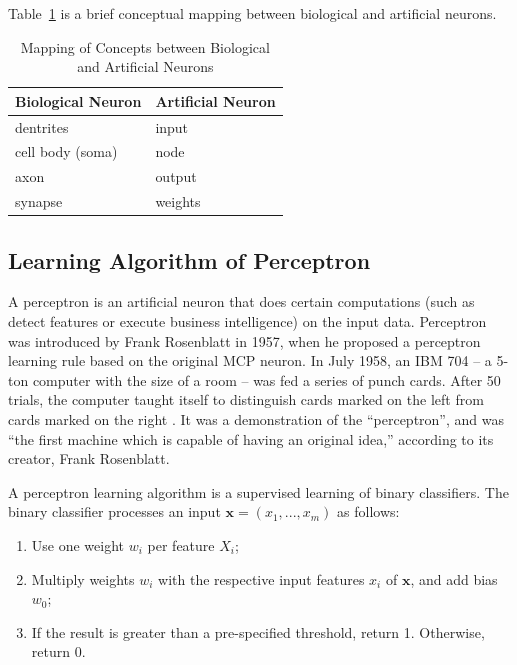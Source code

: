 Table~\ref{tab:bioartneurons} is a brief conceptual mapping between biological and artificial neurons. 

\begin{table}[!htbp]
    \centering
    \begin{tabular}{|l|l|}
    \hline
       Biological Neuron  &  Artificial Neuron \\
       \hline
        dentrites & input \\
        cell body (soma) & node \\
        axon & output \\
        synapse & weights \\ 
        \hline
    \end{tabular}
    \caption{Mapping of Concepts between Biological and Artificial Neurons}
    \label{tab:bioartneurons}
\end{table}

\subsection*{Learning Algorithm of Perceptron}

A perceptron is an artificial neuron that does certain computations (such as detect features or execute business intelligence) on the input data. 
Perceptron was introduced by Frank Rosenblatt in 1957, when he proposed a perceptron learning rule based on the original MCP neuron. In July 1958, an IBM 704 – a 5-ton computer with the size of a room – was fed a series of punch cards. After 50 trials, the computer taught itself to distinguish cards marked on the left from cards marked on the right \cite{cornell2019}. It was a demonstration of the ``perceptron'', and was ``the first machine which is capable of having an original idea,'' according to its creator, Frank Rosenblatt. 


A perceptron learning algorithm is a  supervised learning of binary classifiers. The binary classifier  processes an input $\textbf{x}=(x_1,...,x_m)$ as follows: 
\begin{enumerate}
    \item Use one weight $w_i$ per feature $X_i$;  
    \item Multiply weights $w_i$ with the  respective input features $x_i$ of $\textbf{x}$, and add bias $w_0$; 
    \item If the result is greater than a pre-specified threshold, return 1. Otherwise, return 0. 
\end{enumerate}

